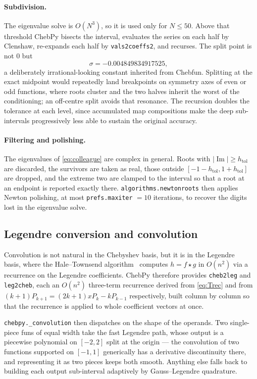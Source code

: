 \documentclass[11pt,a4paper]{article}
\newcommand{\code}[1]{\texttt{#1}}
\begin{document}
\paragraph{Subdivision.}
The eigenvalue solve is $O(N^3)$, so it is used only for $N \le 50$. Above that
threshold ChebPy bisects the interval, evaluates the series on each half by
Clenshaw, re-expands each half by \code{vals2coeffs2}, and recurses. The split
point is not $0$ but
\[
  \sigma = -0.004849834917525,
\]
a deliberately irrational-looking constant inherited from Chebfun. Splitting at
the exact midpoint would repeatedly land breakpoints on symmetry axes of even
or odd functions, where roots cluster and the two halves inherit the worst of
the conditioning; an off-centre split avoids that resonance. The recursion
doubles the tolerance at each level, since accumulated map compositions make
the deep sub-intervals progressively less able to sustain the original
accuracy.

\paragraph{Filtering and polishing.}
The eigenvalues of \eqref{eq:colleague} are complex in general. Roots with
$|\operatorname{Im}| \ge h_{\mathrm{tol}}$ are discarded, the survivors are
taken as real, those outside $[-1-h_{\mathrm{tol}}, 1+h_{\mathrm{tol}}]$ are
dropped, and the extreme two are clamped to the interval so that a root at an
endpoint is reported exactly there. \code{algorithms.newtonroots} then applies
Newton polishing, at most \code{prefs.maxiter} $= 10$ iterations, to recover the
digits lost in the eigenvalue solve.

\subsection{Legendre conversion and convolution}
\label{sec:conv}

Convolution is not natural in the Chebyshev basis, but it is in the Legendre
basis, where the Hale--Townsend algorithm~\cite{hale2014} computes
$h = f \star g$ in $O(n^2)$ via a recurrence on the Legendre coefficients.
ChebPy therefore provides \code{cheb2leg} and \code{leg2cheb}, each an $O(n^2)$
three-term recurrence derived from \eqref{eq:Trec} and from
$(k+1)P_{k+1} = (2k+1)xP_k - kP_{k-1}$ respectively, built column by column so
that the recurrence is applied to whole coefficient vectors at once.

\code{chebpy.\_convolution} then dispatches on the shape of the operands. Two
single-piece funs of equal width take the fast Legendre path, whose output is a
piecewise polynomial on $[-2,2]$ split at the origin --- the convolution of two
functions supported on $[-1,1]$ generically has a derivative discontinuity
there, and representing it as two pieces keeps both smooth. Anything else falls
back to building each output sub-interval adaptively by Gauss--Legendre
quadrature.
\end{document}
